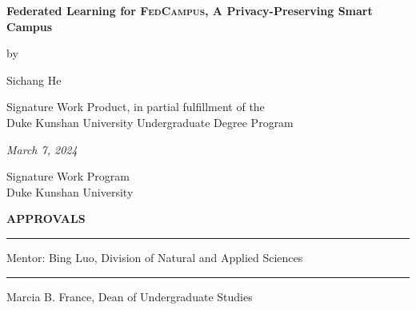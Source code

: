\documentclass[11pt,a4paper,oneside]{report}
\newcommand{\fedcampus}{\textsc{FedCampus}\xspace}
\begin{document}
\newcommand{\authorname}{Sichang He}

\newcommand{\thetitle}{Federated Learning for \fedcampus,
    A Privacy-Preserving Smart Campus
}

\newcommand{\submissiondate}{March 7, 2024}

\newcommand{\mentor}{Bing Luo}

\newcommand{\academicunit}{Division of Natural and Applied Sciences}



\begin{titlepage}

    \vspace*{\bigskipamount}

    \begin{center}
        {\sffamily\LARGE\bfseries\MakeUppercase\thetitle\par}

        \bigskip

        by

        \bigskip

        {\Large \authorname}

        \bigskip

        Signature Work Product, in partial fulfillment of the \\
        Duke Kunshan University Undergraduate Degree Program

        \bigskip

        \emph{\submissiondate}

        \bigskip

        Signature Work Program \\
        Duke Kunshan University

    \end{center}

    \vfill

    \textbf{\textsf{APPROVALS}}

    \bigskip\bigskip\bigskip
    \hrule

    Mentor: \mentor, \academicunit

    \bigskip\bigskip\bigskip
    \hrule

    Marcia B. France, Dean of Undergraduate Studies

\end{titlepage}
\end{document}
